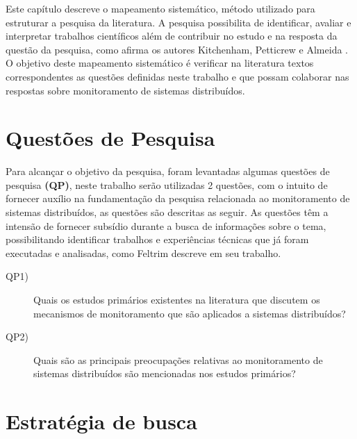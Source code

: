 \label{mapeamento_sistematico}

Este capítulo descreve o mapeamento sistemático, método utilizado para estruturar a pesquisa da literatura. A pesquisa possibilita de identificar, avaliar e interpretar trabalhos científicos além de contribuir no estudo e na resposta da questão da pesquisa, como afirma os autores Kitchenham, Petticrew e Almeida \cite{kitchenham2007guidelines,petticrew2008systematic,de2018mapeamento}. O objetivo deste mapeamento sistemático é verificar na literatura textos correspondentes as questões definidas neste trabalho e que possam colaborar nas respostas sobre monitoramento de sistemas distribuídos.


\section{Questões de Pesquisa}
\label{questoes1e2}

Para alcançar o objetivo da pesquisa, foram levantadas algumas questões de pesquisa \textbf{(QP)}, neste trabalho serão utilizadas 2 questões, com o intuito de fornecer auxílio na fundamentação da pesquisa relacionada ao monitoramento de sistemas distribuídos, as questões são descritas as seguir. As questões têm a intensão de fornecer subsídio durante a busca de informações sobre o tema, possibilitando identificar trabalhos e experiências técnicas que já foram executadas e analisadas, como Feltrim\cite{feltrim2004abordagem} descreve em seu trabalho.

\begin{description}
\item[QP1)] Quais os estudos primários existentes na literatura que discutem os mecanismos de monitoramento 
que são aplicados a sistemas distribuídos?
\item[QP2)] Quais são as principais preocupações relativas ao monitoramento de sistemas distribuídos são mencionadas nos estudos primários?
\end{description}


\section{Estratégia de busca}
\label{sec:stringbusca}

